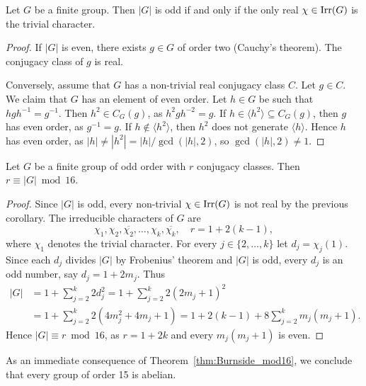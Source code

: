 \begin{corollary}
  \label{corollary:|G|impar}
  Let $G$ be a finite group. Then $|G|$ is odd if and only if
  the only real $\chi\in\operatorname{Irr}(G)$ is the trivial character. 
\end{corollary}

\begin{proof}
    If $|G|$ is even, there exists 
    $g\in G$ of order two (Cauchy's theorem). The conjugacy class of $g$ 
    is real. 

    Conversely, assume that $G$ has a non-trivial 
    real conjugacy class $C$. Let $g\in C$. We claim that 
    $G$ has an element of even order. Let $h\in G$ be such that
    $hgh^{-1}=g^{-1}$. Then $h^2\in C_G(g)$, as $h^2gh^{-2}=g$. 
    If $h\in\langle h^2\rangle\subseteq C_G(g)$, then $g$ has 
    even order, as $g^{-1}=g$. If $h\not\in\langle h^2\rangle$, then 
    $h^2$ does not generate $\langle h\rangle$. Hence $h$ has even order, 
    as $|h|\ne|h^2|=|h|/\gcd(|h|,2)$, so $\gcd(|h|,2)\ne 1$.  
\end{proof}

\begin{theorem}[Burnside]
  \label{thm:Burnside_mod16}
  Let $G$ be a finite group of odd order 
  with $r$ conjugacy classes. Then
  $r\equiv|G|\bmod{16}$.
\end{theorem}

\begin{proof}
  Since $|G|$ is odd, every non-trivial $\chi\in\operatorname{Irr}(G)$ is not real by
  the previous corollary. The irreducible characters 
  of $G$ are  
  \[
    \chi_1,\chi_2,\overline{\chi_2},\dots,\chi_k,\overline{\chi_k},
    \quad
    r=1+2(k-1),
  \]
  where $\chi_1$ denotes the trivial character. 
  For every $j\in\{2,\dots,k\}$ let $d_j=\chi_j(1)$. 
  Since each $d_j$ divides 
  $|G|$ by Frobenius' theorem and  $|G|$ is odd, 
  every $d_j$ is an odd number, 
  say $d_j=1+2m_j$. Thus  
  \begin{align*}
    |G|&=1+\sum_{j=2}^k 2d_j^2=1+\sum_{j=2}^k2(2m_j+1)^2\\
    &=1+\sum_{j=2}^k2(4m_j^2+4m_j+1)
    =1+2(k-1)+8\sum_{j=2}^km_j(m_j+1).
  \end{align*}
  Hence $|G|\equiv r\bmod{16}$, 
  as $r=1+2k$ and every $m_j(m_j+1)$ is even. 
\end{proof}

As an immediate consequence of Theorem~\ref{thm:Burnside_mod16}, we conclude that every group of order 15 is abelian.

